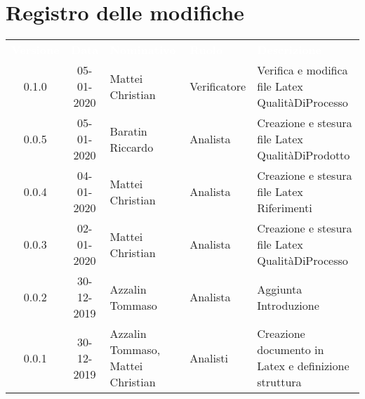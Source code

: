 \section*{Registro delle modifiche}
{
\renewcommand{\arraystretch}{1.5}
\centering
\begin{longtable}{ c c  C{4cm}  C{3cm} C{4cm}}
\textcolor{white}{\textbf{Versione}} & \textcolor{white}{\textbf{Data}} & \textcolor{white}{\textbf{Nominativo}} & \textcolor{white}{\textbf{Ruolo}} & \textcolor{white}{\textbf{Descrizione}}\\	

0.1.0 & 05-01-2020 & Mattei Christian & Verificatore & Verifica e modifica file Latex QualitàDiProcesso \\
0.0.5 & 05-01-2020 & Baratin Riccardo & Analista & Creazione e stesura file Latex QualitàDiProdotto \\
0.0.4 & 04-01-2020 & Mattei Christian & Analista & Creazione e stesura file Latex Riferimenti \\
0.0.3 & 02-01-2020 & Mattei Christian & Analista & Creazione e stesura file Latex QualitàDiProcesso \\
0.0.2 & 30-12-2019 & Azzalin Tommaso & Analista & Aggiunta Introduzione \\
0.0.1 & 30-12-2019 & Azzalin Tommaso, Mattei Christian & Analisti & Creazione documento in Latex e definizione struttura \\	
		
\end{longtable}
}
